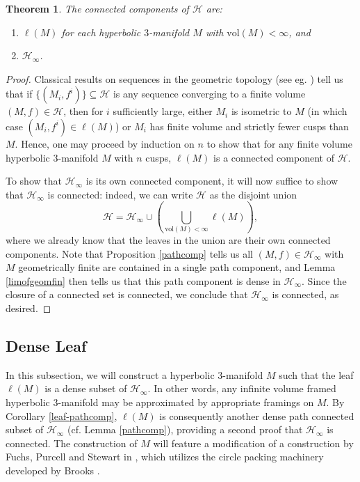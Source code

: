 \documentclass[11pt,leqno]{article}
\newtheorem{theorem}{Theorem}
\theoremstyle{introdef}
\numberwithin{lemma}{section}
\theoremstyle{definition}
\begin{document}
\begin{theorem}
\label{Thm-connectedcomponents}
    The connected components of $\mathcal{H}$ are:
    \begin{enumerate}
        \item $\ell(M)$ for each hyperbolic $3$-manifold $M$ with $\mathrm{vol}(M)<\infty$, and
        \item $\mathcal{H}_\infty$.
    \end{enumerate}
\end{theorem}

\begin{proof}
    Classical results on sequences in the geometric topology (see eg. \cite[Theorem E.2.4]{BEN}) tell us that if $\{(M_i,f^i)\}\subseteq\mathcal{H}$ is any sequence converging to a finite volume $(M,f)\in\mathcal{H}$, then for $i$ sufficiently large, either $M_i$ is isometric to $M$ (in which case $(M_i,f^i)\in\ell(M)$) or $M_i$ has finite volume and strictly fewer cusps than $M$. Hence, one may proceed by induction on $n$ to show that for any finite volume hyperbolic $3$-manifold $M$ with $n$ cusps, $\ell(M)$ is a connected component of $\mathcal{H}$.\par
    
    To show that $\mathcal{H}_\infty$ is its own connected component, it will now suffice to show that $\mathcal{H}_\infty$ is connected: indeed, we can write $\mathcal{H}$ as the disjoint union \[\mathcal{H}=\mathcal{H}_\infty\cup\left(\bigcup_{\mathrm{vol}(M)<\infty}\ell(M)\right),\] where we already know that the leaves in the union are their own connected components. Note that Proposition \ref{pathcomp} tells us all $(M,f)\in\mathcal{H}_\infty$ with $M$ geometrically finite are contained in a single path component, and Lemma \ref{limofgeomfin} then tells us that this path component is dense in $\mathcal{H}_\infty$. Since the closure of a connected set is connected, we conclude that $\mathcal{H}_\infty$ is connected, as desired.
\end{proof}





\subsection{Dense Leaf}
\label{subsec-denseleaf}

In this subsection, we will construct a hyperbolic $3$-manifold $M$ such that the leaf $\ell(M)$ is a dense subset of $\mathcal{H}_\infty$. In other words, any infinite volume framed hyperbolic $3$-manifold may be approximated by appropriate framings on $M$. By Corollary \ref{leaf-pathcomp}, $\ell(M)$ is consequently another dense path connected subset of $\mathcal{H}_\infty$ (cf. Lemma \ref{pathcomp}), providing a second proof that $\mathcal{H}_\infty$ is connected. The construction of $M$ will feature a modification of a construction by Fuchs, Purcell and Stewart in \cite{PUR}, which utilizes the circle packing machinery developed by Brooks \cite{BRO}.\par
\end{document}
